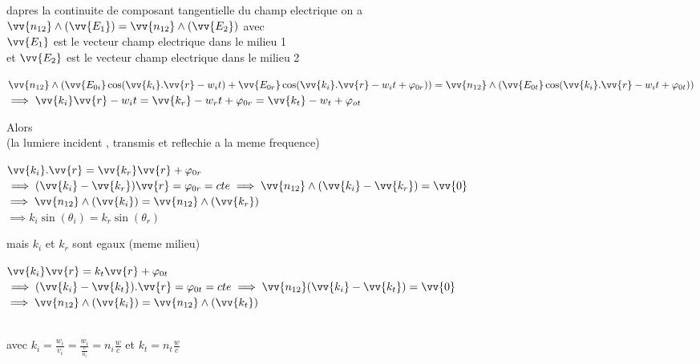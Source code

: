 \documentclass[12pt]{book}
\begin{document}
                \begin{center}
                    dapres la continuite de composant tangentielle du champ electrique on a \\
                    $ \vv{n_{12}}\wedge(\vv{E_1}) = \vv{n_{12}}\wedge(\vv{E_2}) $ avec \\ $\vv{E_1} $ est le vecteur champ electrique dans le milieu 1 \\ et $\vv{E_2} $ est le vecteur champ electrique dans le milieu 2
                \end{center}
                    $ \vv{n_{12}}\wedge(\vv{E_{0i}}\cos(\vv{k_i}.\vv{r}-w_it) +  \vv{E_{0r}}\cos(\vv{k_i}.\vv{r}-w_it + \varphi_{0r})) = \vv{n_{12}}\wedge( \vv{E_{0t}}\cos(\vv{k_i}.\vv{r}-w_it + \varphi_{0t})) $
                    \\ $\implies \vv{k_i}\vv{r}-w_it =\vv{k_r}-w_rt + \varphi_{0r} = \vv{k_t} -w_t + \varphi_{ot}$
                    \begin{center}
                        Alors   \\ 
                        (la lumiere incident , transmis et reflechie a la meme frequence)
                    \end{center}
                $\vv{k_i}.\vv{r}=\vv{k_r}\vv{r}+ \varphi_{0r}$ \\
                $\implies(\vv{k_i}-\vv{k_r})\vv{r} = \varphi_{0r}= cte \implies \vv{n_{12}} \wedge(\vv{k_i}-\vv{k_r}) = \vv{0}$ \\
                $\implies \vv{n_{12}} \wedge(\vv{k_i}) = \vv{n_{12}}\wedge(\vv{k_r})$ \\
                $\implies k_i\sin(\theta_i) = k_r\sin(\theta_r)$ \\
                \begin{center}
                    mais $k_i$ et $k_r$ sont egaux (meme milieu) \\
                \end{center}
                $ \vv{k_i}\vv{r} = k_t\vv{r} + \varphi_{0t} $\\ 
                $\implies(\vv{k_i}-\vv{k_t}).\vv{r} = \varphi_{0t} = cte \implies \vv{n_{12}} (\vv{k_i}-\vv{k_t}) = \vv{0}$
                $\implies \vv{n_{12}} \wedge(\vv{k_i}) = \vv{n_{12}}\wedge(\vv{k_t})$ \\
                \begin{center}
                     \\
                    avec $k_i = \frac{w_i}{v_i} =\frac{w_i}{\frac{c}{n_i}}=n_i\frac{w}{c} $ et $k_t=n_t \frac{w}{c}$
                \end{center} 
\end{document}
